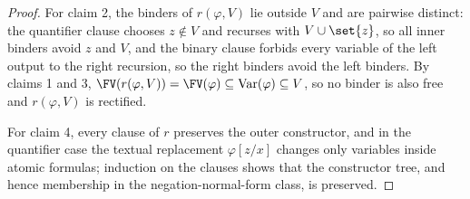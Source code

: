 \begin{proof}
For claim 2, the binders of \(r(\varphi,V)\) lie outside \(V\) and are
pairwise distinct: the quantifier clause chooses \(z\notin V\) and
recurses with \(V\cup\set{z}\), so all inner binders avoid \(z\) and
\(V\), and the binary clause forbids every variable of the left output to
the right recursion, so the right binders avoid the left binders.  By
claims 1 and 3, \(\FV(r(\varphi,V))=\FV(\varphi)\subseteq
\operatorname{Var}(\varphi)\subseteq V\), so no binder is also free and
\(r(\varphi,V)\) is rectified.

For claim 4, every clause of \(r\) preserves the outer constructor, and
in the quantifier case the textual replacement \(\varphi[z/x]\) changes
only variables inside atomic formulas; induction on the clauses shows
that the constructor tree, and hence membership in the
negation-normal-form class, is preserved.
\end{proof}

